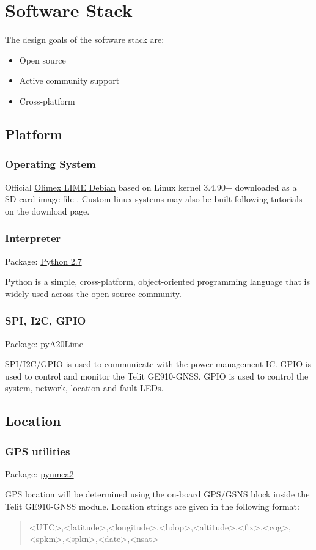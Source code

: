 \section{Software Stack}

The design goals of the software stack are:
\begin{itemize}
\item Open source
\item Active community support
\item Cross-platform
\end{itemize}

\subsection{Platform}
\subsubsection{Operating System}
Official \href{https://www.olimex.com/wiki/A20-OLinuXino-LIME#How_to_generate_boot-able_SD-card_Debian_Linux_image_for_A20-OLinuXino-LIME.3F}{Olimex LIME Debian} based on Linux kernel 3.4.90+ downloaded as a SD-card image file . Custom linux systems may also be built following tutorials on the download page.

\subsubsection{Interpreter}

Package:	\href{https://www.python.org/downloads/release/python-279/}{Python 2.7}

Python is a simple, cross-platform, object-oriented programming language that is widely used across the open-source community.

\subsubsection{SPI, I2C, GPIO}
	
Package:	\href{https://pypi.python.org/pypi/pyA20Lime}{pyA20Lime}

SPI/I2C/GPIO is used to communicate with the power management IC. GPIO is used to control and monitor the Telit GE910-GNSS. GPIO is used to control the system, network, location and fault LEDs.
    
\subsection{Location}

\subsubsection{GPS utilities}

Package:	\href{https://github.com/Knio/pynmea2}{pynmea2}

GPS location will be determined using the on-board GPS/GSNS block inside the Telit GE910-GNSS module. Location strings are given in the following format:
\begin{quote}
<UTC>,<latitude>,<longitude>,<hdop>,<altitude>,<fix>,<cog>,<spkm>,<spkn>,<date>,<nsat>
\end{quote}

    
    